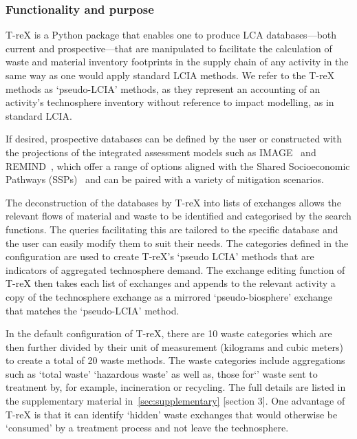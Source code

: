 \documentclass[a4paper,fleqn]{cas-dc}
\begin{document}
\subsubsection{Functionality and purpose}

T-reX is a Python package that enables one to produce LCA databases---both
current and prospective---that are manipulated to facilitate the calculation of
waste and material inventory footprints in the supply chain of any activity in
the same way as one would apply standard LCIA methods. We refer to the T-reX
methods as `pseudo-LCIA' methods, as they represent an accounting of an
activity's technosphere inventory without reference to impact modelling, as in
standard LCIA.

If desired, prospective databases can be defined by the user or constructed
with the projections of the integrated assessment models such as
IMAGE~\citep{stehfest2014image} and REMIND~\citep{remind2020model}, which offer
a range of options aligned with the Shared Socioeconomic Pathways
(SSPs)~\citep{ssp2020ghg} and can be paired with a variety of mitigation
scenarios.

The deconstruction of the databases by T-reX into lists of exchanges allows the
relevant flows of material and waste to be identified and categorised by the
search functions. The queries facilitating this are tailored to the specific
database and the user can easily modify them to suit their needs. The
categories defined in the configuration are used to create T-reX's `pseudo
LCIA' methods that are indicators of aggregated technosphere demand. The
exchange editing function of T-reX then takes each list of exchanges and
appends to the relevant activity a copy of the technosphere exchange as a
mirrored `pseudo-biosphere' exchange that matches the `pseudo-LCIA' method.

In the default configuration of T-reX, there are 10 waste categories which are
then further divided by their unit of measurement (kilograms and cubic meters)
to create a total of 20 waste methods. The waste categories include
aggregations such as `total waste' `hazardous waste' as well as, those for`'
waste sent to treatment by, for example, incineration or recycling. The full
details are listed in the supplementary material in~\autoref{sec:supplementary}
[section 3]. One advantage of T-reX is that it can identify `hidden' waste
exchanges that would otherwise be `consumed' by a treatment process and not
leave the technosphere.
\end{document}
